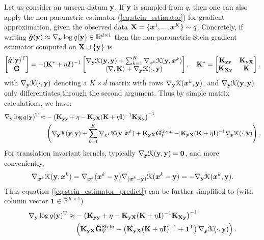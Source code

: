 Let us consider an unseen datum $\mathbf{y}$. If $\mathbf{y}$ is sampled from $q$, then one can also apply the non-parametric estimator (\ref{eq:stein_estimator}) for gradient approximation, given the observed data $\mathbf{X} = \{\bm{x}^1, ..., \bm{x}^K \} \sim q$. Concretely, if writing $\hat{\bm{g}}(\mathbf{y}) \approx \nabla_{\mathbf{y}} \log q(\mathbf{y}) \in \mathbb{R}^{d \times 1}$ then the non-parametric Stein gradient estimator computed on $\mathbf{X} \cup \{\mathbf{y}\}$ is
\begin{equation*}
\begin{bmatrix}
\hat{\bm{g}}(\mathbf{y})^{\text{T}} \\
\hat{\mathbf{G}}
\end{bmatrix}
= -( \mathbf{K}^* + \eta \bm{I} )^{-1} 
\begin{bmatrix}
\nabla_{\mathbf{y}} \mathcal{K}(\mathbf{y}, \mathbf{y}) + \sum_{k=1}^{K} \nabla_{\bm{x}^k} \mathcal{K}(\mathbf{y}, \bm{x}^k) \\
\langle \nabla, \mathbf{K} \rangle + \nabla_{\mathbf{y}} \mathcal{K}(\cdot, \mathbf{y})
\end{bmatrix}
, \quad 
\mathbf{K}^* = \begin{bmatrix}
    \mathbf{K}_{\mathbf{y} \mathbf{y}}       & \mathbf{K}_{\mathbf{y}\mathbf{X}} \\
    \mathbf{K}_{\mathbf{X} \mathbf{y}}       & \mathbf{K}
\end{bmatrix},
\end{equation*}
with $\nabla_{\mathbf{y}} \mathcal{K}(\cdot, \mathbf{y})$ denoting a $K \times d$ matrix with rows $\nabla_{\mathbf{y}} \mathcal{K}(\bm{x}^k, \mathbf{y})$, and $\nabla_{\mathbf{y}} \mathcal{K}(\mathbf{y}, \mathbf{y})$ only differentiates through the second argument. Thus by simple matrix calculations, we have:
\begin{equation}
\begin{aligned}
\nabla_{\mathbf{y}} \log q(\mathbf{y})^{\text{T}} \approx& -\left(\mathbf{K}_{\mathbf{y}\mathbf{y}} + \eta - \mathbf{K}_{\mathbf{y}\mathbf{X}} (\mathbf{K} + \eta \mathbf{I})^{-1} \mathbf{K}_{\mathbf{X}\mathbf{y}} \right)^{-1} \\&\left( \nabla_{\mathbf{y}} \mathcal{K}(\mathbf{y}, \mathbf{y}) + \sum_{k=1}^{K} \nabla_{\bm{x}^k} \mathcal{K}(\mathbf{y}, \bm{x}^k) + \mathbf{K}_{\mathbf{y}\mathbf{X}} \hat{\mathbf{G}}_{V}^{\text{Stein}} - \mathbf{K}_{\mathbf{y}\mathbf{X}} (\mathbf{K} + \eta \mathbf{I})^{-1} \nabla_{\mathbf{y}} \mathcal{K}(\cdot, \mathbf{y}) \right).
\end{aligned}
\label{eq:stein_estimator_predict}
\end{equation}
For translation invariant kernels, typically $\nabla_{\mathbf{y}} \mathcal{K}(\mathbf{y}, \mathbf{y}) = \bm{0}$, and more conveniently, 
$$ \nabla_{\bm{x}^k} \mathcal{K}(\mathbf{y}, \bm{x}^k) = \nabla_{\bm{x}^k} (\bm{x}^k - \mathbf{y}) \nabla_{(\bm{x}^k - \mathbf{y})} \mathcal{K}(\bm{x}^k - \mathbf{y}) = - \nabla_{\mathbf{y}} \mathcal{K}(\bm{x}^k, \mathbf{y}).$$
Thus equation (\ref{eq:stein_estimator_predict}) can be further simplified to (with column vector $\bm{1} \in \mathbb{R}^{K \times 1}$)
\begin{equation}
\begin{aligned}
\nabla_{\mathbf{y}} \log q(\mathbf{y})^{\text{T}} \approx& -\left(\mathbf{K}_{\mathbf{y}\mathbf{y}} + \eta - \mathbf{K}_{\mathbf{y}\mathbf{X}} (\mathbf{K} + \eta \mathbf{I})^{-1} \mathbf{K}_{\mathbf{X}\mathbf{y}} \right)^{-1} \\&\left( \mathbf{K}_{\mathbf{y}\mathbf{X}} \hat{\mathbf{G}}_{V}^{\text{Stein}} - \left( \mathbf{K}_{\mathbf{y}\mathbf{X}} (\mathbf{K} + \eta \mathbf{I})^{-1} + \bm{1}^{\text{T}} \right) \nabla_{\mathbf{y}} \mathcal{K}(\cdot, \mathbf{y}) \right).
\end{aligned}
\label{eq:stein_estimator_predict_simplified}
\end{equation}
